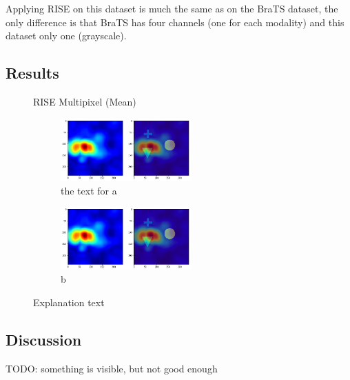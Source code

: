 Applying RISE on this dataset is much the same as on the BraTS dataset, the only difference is that BraTS has four channels (one for each modality) and this dataset only one (grayscale).

\subsection{Results}
\begin{figure}[H]
    \centering
    \caption{RISE Multipixel (Mean)}
    \begin{subfigure}{.5\textwidth}
        \centering
        \includegraphics[width=5cm]{chapters/05_testnet/images/rise_1.png}
        \caption{ the text for a}
    \end{subfigure}%
    \begin{subfigure}{.5\textwidth}
        \centering
        \includegraphics[width=5cm]{chapters/05_testnet/images/rise_1.png}
        \caption{b}
    \end{subfigure}
    \caption{Explanation text}
\end{figure}

\subsection{Discussion}
TODO: something is visible, but not good enough

